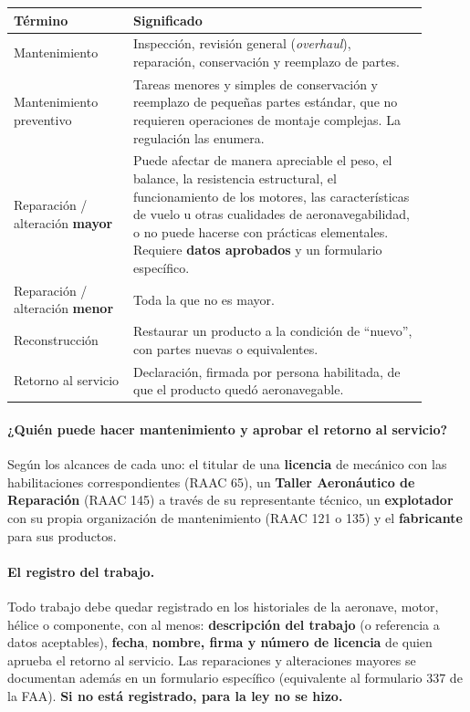 \begin{center}
\small
\begin{tabular}{|p{0.26\linewidth}|p{0.64\linewidth}|}
\hline
\textbf{Término} & \textbf{Significado} \\ \hline
Mantenimiento & Inspección, revisión general (\textit{overhaul}), reparación, conservación y
reemplazo de partes. \\ \hline
Mantenimiento preventivo & Tareas menores y simples de conservación y reemplazo de pequeñas
partes estándar, que no requieren operaciones de montaje complejas. La regulación las enumera.
\\ \hline
Reparación / alteración \textbf{mayor} & Puede afectar de manera apreciable el peso, el
balance, la resistencia estructural, el funcionamiento de los motores, las características de
vuelo u otras cualidades de aeronavegabilidad, o no puede hacerse con prácticas elementales.
Requiere \textbf{datos aprobados} y un formulario específico. \\ \hline
Reparación / alteración \textbf{menor} & Toda la que no es mayor. \\ \hline
Reconstrucción & Restaurar un producto a la condición de ``nuevo'', con partes nuevas o
equivalentes. \\ \hline
Retorno al servicio & Declaración, firmada por persona habilitada, de que el producto quedó
aeronavegable. \\ \hline
\end{tabular}
\end{center}

\paragraph*{¿Quién puede hacer mantenimiento y aprobar el retorno al servicio?}
Según los alcances de cada uno: el titular de una \textbf{licencia} de mecánico con las
habilitaciones correspondientes (RAAC 65), un \textbf{Taller Aeronáutico de Reparación} (RAAC 145)
a través de su representante técnico, un \textbf{explotador} con su propia organización de
mantenimiento (RAAC 121 o 135) y el \textbf{fabricante} para sus productos.

\paragraph*{El registro del trabajo.}
Todo trabajo debe quedar registrado en los historiales de la aeronave, motor, hélice o componente,
con al menos: \textbf{descripción del trabajo} (o referencia a datos aceptables), \textbf{fecha},
\textbf{nombre, firma y número de licencia} de quien aprueba el retorno al servicio. Las
reparaciones y alteraciones mayores se documentan además en un formulario específico (equivalente
al formulario 337 de la FAA). \textbf{Si no está registrado, para la ley no se hizo.}

